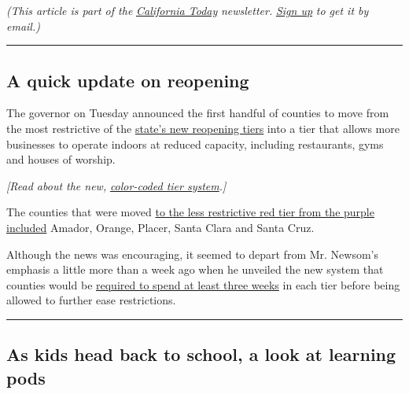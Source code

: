 \emph{(This article is part of the}
\href{https://www.nytimes3xbfgragh.onion/column/california-today}{\emph{California
Today}} \emph{newsletter.}
\href{https://www.nytimes3xbfgragh.onion/newsletters/california-today}{\emph{Sign
up}} \emph{to get it by email.)}

\begin{center}\rule{0.5\linewidth}{\linethickness}\end{center}

\hypertarget{a-quick-update-on-reopening}{%
\subsection{A quick update on
reopening}\label{a-quick-update-on-reopening}}

The governor on Tuesday announced the first handful of counties to move
from the most restrictive of the
\href{https://www.nytimes3xbfgragh.onion/2020/08/31/us/california-coronavirus-reopening.html}{state's
new reopening tiers} into a tier that allows more businesses to operate
indoors at reduced capacity, including restaurants, gyms and houses of
worship.

\emph{{[}Read about the new,}
\href{https://www.nytimes3xbfgragh.onion/2020/08/31/us/california-coronavirus-reopening.html}{\emph{color-coded
tier system}}\emph{.{]}}

The counties that were moved \href{https://covid19.ca.gov/}{to the less
restrictive red tier from the purple included} Amador, Orange, Placer,
Santa Clara and Santa Cruz.

Although the news was encouraging, it seemed to depart from Mr. Newsom's
emphasis a little more than a week ago when he unveiled the new system
that counties would be
\href{https://www.sfchronicle.com/politics/article/California-s-new-rules-for-coronavirus-15522578.php}{required
to spend at least three weeks} in each tier before being allowed to
further ease restrictions.

\begin{center}\rule{0.5\linewidth}{\linethickness}\end{center}

\hypertarget{as-kids-head-back-to-school-a-look-at-learning-pods}{%
\subsection{As kids head back to school, a look at learning
pods}\label{as-kids-head-back-to-school-a-look-at-learning-pods}}

